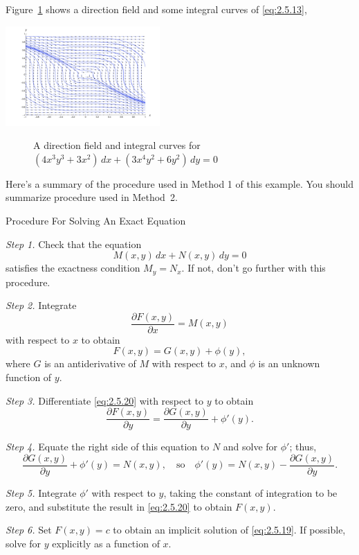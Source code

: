 \documentclass{ximera}
\begin{document}
\begin{example}
\begin{explanation}
Figure~\ref{figure:2.5.1} shows a direction field and  some
integral curves of \eqref{eq:2.5.13},

\begin{image}
  \includegraphics[height=1.5in]{fig020501.jpg} \end{image}
\begin{center}
\begin{figure}
   \caption{A direction field and  integral curves for
$(4x^3y^3+3x^2)\,dx+(3x^4y^2+6y^2)\,dy=0$}
  \label{figure:2.5.1}
\end{figure}
\end{center}
\end{explanation}
\end{example}


Here's a summary of the procedure used in Method 1 of this
example. You should summarize procedure used in Method~2.


Procedure For Solving An Exact
Equation


\begin{procedure}

\textit{Step 1.} Check that the equation
\begin{equation} \label{eq:2.5.19}
 M(x,y)\,dx+N(x,y)\,dy=0
\end{equation}
satisfies the exactness condition  $M_y=N_x$. If not,
don't go further with this procedure.

\textit{Step 2.} Integrate
$$
\frac{\partial F(x,y)}{\partial x}=M(x,y)
$$
with respect to $x$ to obtain
\begin{equation} \label{eq:2.5.20}
F(x,y)=G(x,y)+\phi(y),
\end{equation}
where $G$ is an antiderivative of $M$ with respect to $x$, and $\phi$
is an unknown function of $y$.

\textit{Step 3.} Differentiate \eqref{eq:2.5.20} with respect to
$y$  to obtain
$$
\frac{\partial F(x,y)}{\partial y}=\frac{\partial G(x,y)}{\partial
y}+\phi'(y).
$$

\textit{Step 4.} Equate the right side of this equation to $N$ and solve
for $\phi'$;    thus,
$$
 \frac{\partial G(x,y)}{\partial y}+\phi'(y)=N(x,y),\quad\text{so}\quad
\phi'(y)=N(x,y)-\frac{\partial G(x,y)}{\partial y}.
$$

\textit{Step 5.} Integrate $\phi'$ with respect to $y$, taking the
constant of integration to be zero, and substitute the result in
\eqref{eq:2.5.20} to obtain $F(x,y)$.

\textit{Step 6.} Set $F(x,y)=c$ to obtain an implicit solution of
\eqref{eq:2.5.19}. If possible, solve for $y$ explicitly as a
function of $x$.

\end{procedure}
\end{document}

